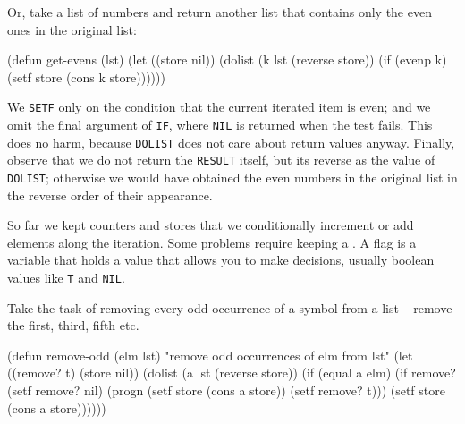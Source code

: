 \documentclass[a4paper,11pt]{article}
\begin{document}
\begin{uenum}
\item Or, take a list of numbers and return another list that contains only the even ones in the original list: 

\begin{lispcode}
(defun get-evens (lst)
  (let ((store nil))
	(dolist (k lst (reverse store))
	  (if (evenp k)
		(setf store (cons k store))))))
\end{lispcode}

We \Verb+SETF+ only on the condition that the current iterated item is even; and we omit the final argument of \Verb+IF+, where \Verb+NIL+ is returned when the test fails. This does no harm, because \Verb+DOLIST+ does not care about return values anyway. Finally, observe that we do not return the \Verb+RESULT+ itself, but its reverse as the value of \Verb+DOLIST+; otherwise we would have obtained the even numbers in the original list in the reverse order of their appearance. 

\item So far we kept counters and stores that we conditionally increment or add elements along the iteration. Some problems require keeping a . A flag is a variable that holds a value that allows you to make decisions, usually boolean values like \Verb+T+ and \Verb+NIL+. 

\begin{uenumi}
\item Take the task of removing every odd occurrence of a symbol from a list -- remove the first, third, fifth etc.  

\begin{lispcode}
(defun remove-odd (elm lst)
  "remove odd occurrences of elm from lst"
  (let ((remove? t)
		(store nil))
	(dolist (a lst (reverse store))
	  (if (equal a elm)
		(if remove?
		  (setf remove? nil)
		  (progn
			(setf store (cons a store))
			(setf remove? t))) 
		(setf store (cons a store))))))
\end{lispcode}


\end{uenumi}
\end{uenum}
\end{document}
